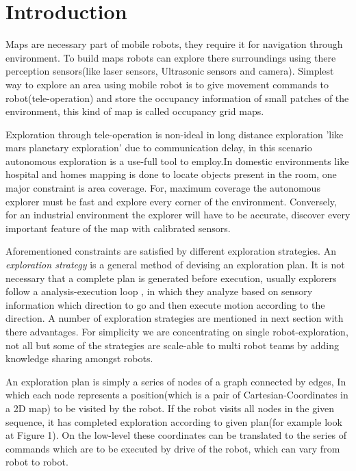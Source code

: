 \section{Introduction}
\label{sec:intro}
Maps are necessary part of mobile robots, they require it for navigation through environment. To
build maps robots can explore there surroundings using there perception sensors(like laser sensors,
Ultrasonic sensors and camera). Simplest way to explore an area using mobile robot is to give
movement commands to robot(tele-operation) and store the occupancy information of small patches of
the environment, this kind of map is called occupancy grid maps. \par

Exploration through tele-operation is non-ideal in long distance exploration 'like mars planetary
exploration' due to communication delay, in this scenario autonomous exploration is a use-full tool
to employ.In domestic environments like hospital and homes mapping is done to locate objects present
in the room, one major constraint is area coverage. For, maximum coverage the autonomous explorer
must be fast and explore every corner of the environment. Conversely, for an industrial environment
the explorer will have to be accurate, discover every important feature of the map with calibrated
sensors. \par

Aforementioned constraints are satisfied by different exploration strategies. An \textit{exploration
strategy} is a general method of devising an exploration plan. It is not necessary that a complete
plan is generated before execution, usually explorers follow a analysis-execution loop , in which
they analyze based on sensory information which direction to go and then execute motion according to
the direction. A number of exploration strategies are mentioned in next section with there
advantages. For simplicity we are concentrating on single robot-exploration, not all but some of the
strategies are scale-able to multi robot teams by adding knowledge sharing amongst robots. \par

An exploration plan is simply a series of nodes of a graph connected by edges, In which each node
represents a position(which is a pair of Cartesian-Coordinates in a 2D map) to be visited by the
robot. If the robot visits all nodes in the given sequence, it has completed exploration according
to given plan(for example look at Figure 1). On the low-level these coordinates can be translated to
the series of commands which are to be executed by drive of the robot, which can vary from robot to
robot. \par

